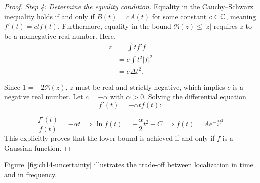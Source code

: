 \begin{proof}
\textit{Step 4: Determine the equality condition.}
Equality in the Cauchy--Schwarz inequality holds if and only if $B(t) = c A(t)$ for some constant $c \in \mathbb{C}$, meaning $f'(t) = c t f(t)$.
Furthermore, equality in the bound $\Re(z) \leq |z|$ requires $z$ to be a nonnegative real number. Here,
\[
\begin{aligned}
z &= \int t f' \bar{f} \\
&= c \int t^2 |f|^2 \\
&= c \Delta t^2.
\end{aligned}
\]

Since $1 = -2 \Re(z)$, $z$ must be real and strictly negative, which implies $c$ is a negative real number. Let $c = -\alpha$ with $\alpha > 0$.
Solving the differential equation
\[
f'(t) = -\alpha t f(t):
\]

\begin{equation}
\frac{f'(t)}{f(t)} = -\alpha t \implies \ln f(t) = -\frac{\alpha}{2} t^2 + C \implies f(t) = A e^{-\frac{\alpha}{2} t^2}
\end{equation}
This explicitly proves that the lower bound is achieved if and only if $f$ is a Gaussian function.
\end{proof}

Figure~\ref{fig:ch14-uncertainty} illustrates the trade-off between localization in time and in frequency.

